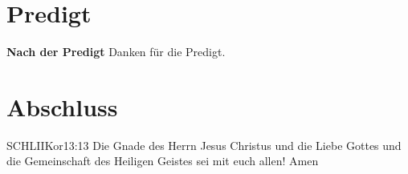 \documentclass[fontsize=14pt]{../../inc/mybib}
\begin{document}
\section{Predigt}
\textbf{Nach der Predigt}\newline
Danken für die Predigt.\newline

\section{Abschluss}


\beten{}

\begin{bibelbox}{SCHL}{IIKor}{13:13}
    Die Gnade des Herrn Jesus Christus und die Liebe Gottes und die Gemeinschaft des Heiligen Geistes sei mit euch allen! Amen
\end{bibelbox}
\end{document}
